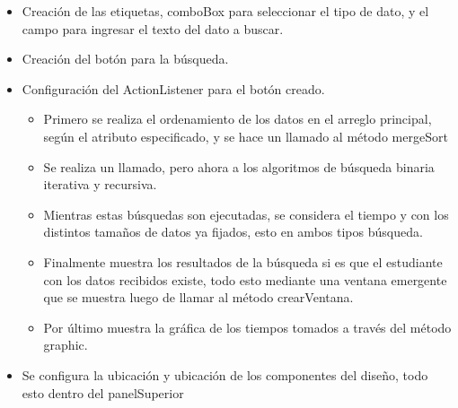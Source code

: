 \documentclass{article}
\begin{document}
    \begin{itemize}
        \begin{itemize}
            \item Creación de las etiquetas, comboBox para seleccionar el tipo de dato, y el campo para ingresar el texto del dato a buscar.
        \end{itemize}
    \end{itemize}
    

    \begin{itemize}
        \begin{itemize}
            \item Creación del botón para la búsqueda.
            \item Configuración del ActionListener para el botón creado.
            \begin{itemize}
                \item Primero se realiza el ordenamiento de los datos en el arreglo principal, según el atributo especificado, y se hace un llamado al método mergeSort
                \item Se realiza un llamado, pero ahora a los algoritmos de búsqueda binaria iterativa y recursiva.
                \item Mientras estas búsquedas son ejecutadas, se considera el tiempo y con los distintos tamaños de datos ya fijados, esto en ambos tipos búsqueda.
                \item Finalmente muestra los resultados de la búsqueda si es que el estudiante con los datos recibidos existe, todo esto mediante una ventana emergente que se muestra luego de llamar al método crearVentana.
                \item Por último muestra la gráfica de los tiempos tomados a través del método graphic.
            \end{itemize}
        \end{itemize}
    \end{itemize}
    

    \begin{itemize}
        \begin{itemize}
            \item Se configura la ubicación y ubicación de los componentes del diseño, todo esto dentro del panelSuperior
        \end{itemize}
    \end{itemize}
    
\end{document}
